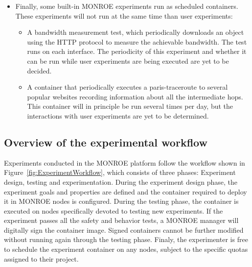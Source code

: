 \documentclass[a4paper,10pt]{article}
\newcommand{\monroe}{MONROE}
\begin{document}
\begin{itemize}
\begin{itemize}
		\item A ping experiment.
		Container number \num{1} executes continuously an ICMP ping operation to a fixed external server (currently, Google's DNS at 8.8.8.8).
		The RTT values are collected and transferred to the servers.
		The ping experiment runs continuously with a frequency of one second, for every interface.
		\item A container that runs Tstat, the passive mPlane monitoring probe that collects, for each interface, detailed flow level statistics.
		The Tstat container generates no traffic; flow level data is synchronized to the \monroe{} repository using the standard synchronization process described above.
	\end{itemize}
	\item Finally, some built-in \monroe{} experiments run as scheduled containers.
	These experiments will not run at the same time than user experiments:
	\begin{itemize}
		\item A bandwidth measurement test, which periodically downloads an object using the HTTP protocol to measure the achievable bandwidth.
		The test runs on each interface.
		The periodicity of this experiment and whether it can be run while user experiments are being executed are yet to be decided.
		\item A container that periodically executes a paris-traceroute to several popular websites recording information about all the intermediate hops.
		This container will in principle be run several times per day, but the interactions with user experiments are yet to be determined.
	\end{itemize}
\end{itemize}

\subsection{Overview of the experimental workflow}

Experiments conducted in the \monroe{} platform follow the workflow shown in Figure~\ref{fig:ExperimentWorkflow}, which consists of three phases: Experiment design, testing and experimentation.
During the experiment design phase, the experiment goals and properties are defined and the container required to deploy it in \monroe{} nodes is configured.
During the testing phase, the container is executed on nodes specifically devoted to testing new experiments.
If the experiment passes all the safety and behavior tests, a \monroe{} manager will digitally sign the container image.
Signed containers cannot be further modified without running again through the testing phase.
Finaly, the experimenter is free to schedule the experiment container on any nodes, subject to the specific quotas assigned to their project.
\end{document}
